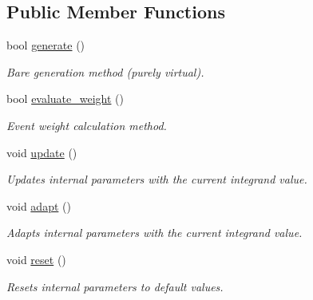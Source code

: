 \subsection*{Public Member Functions}
\begin{DoxyCompactItemize}
\item 
bool \hyperlink{a00401_a23098c7456702cce4946d0d787f5bf37}{generate} ()
\begin{DoxyCompactList}\small\item\em \textquotesingle{}Bare generation\textquotesingle{} method (purely virtual). \end{DoxyCompactList}\item 
\hypertarget{a00401_a1c398ce4d7dd1aed47752d2391ae11df}{}bool \hyperlink{a00401_a1c398ce4d7dd1aed47752d2391ae11df}{evaluate\+\_\+weight} ()\label{a00401_a1c398ce4d7dd1aed47752d2391ae11df}

\begin{DoxyCompactList}\small\item\em Event weight calculation method. \end{DoxyCompactList}\item 
\hypertarget{a00401_a40cc397db66b0451b6135c80645e50b9}{}void \hyperlink{a00401_a40cc397db66b0451b6135c80645e50b9}{update} ()\label{a00401_a40cc397db66b0451b6135c80645e50b9}

\begin{DoxyCompactList}\small\item\em Updates internal parameters with the current integrand value. \end{DoxyCompactList}\item 
\hypertarget{a00401_a02d5211d206546de42ec20bbfbf6ecef}{}void \hyperlink{a00401_a02d5211d206546de42ec20bbfbf6ecef}{adapt} ()\label{a00401_a02d5211d206546de42ec20bbfbf6ecef}

\begin{DoxyCompactList}\small\item\em Adapts internal parameters with the current integrand value. \end{DoxyCompactList}\item 
\hypertarget{a00401_acc228746623bfc5c6f3f1d62f3a841e6}{}void \hyperlink{a00401_acc228746623bfc5c6f3f1d62f3a841e6}{reset} ()\label{a00401_acc228746623bfc5c6f3f1d62f3a841e6}

\begin{DoxyCompactList}\small\item\em Resets internal parameters to default values. \end{DoxyCompactList}\end{DoxyCompactItemize}


